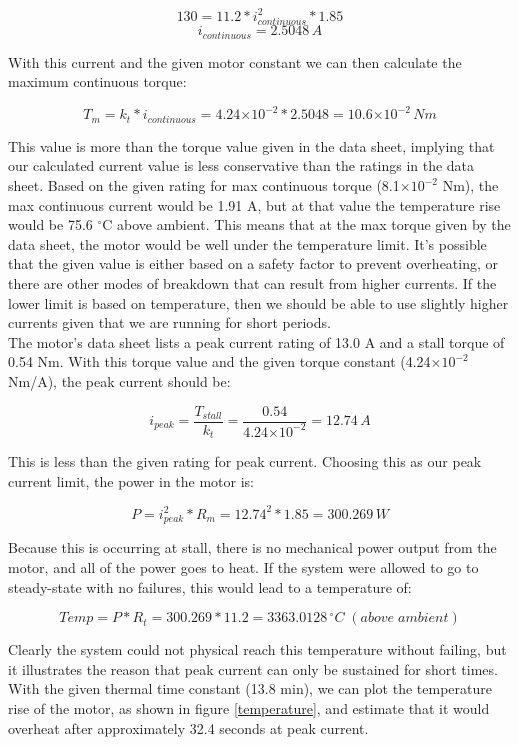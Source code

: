 \documentclass{article}
\theoremstyle{plain}
\theoremstyle{definition}
\theoremstyle{remark}
\providecommand{\e}[1]{\ensuremath{\times 10^{#1}}}
\begin{document}
$$130 = 11.2*i_{continuous}^2*1.85$$
$$i_{continuous} = 2.5048 \,A$$

With this current and the given motor constant we can then calculate the maximum continuous torque:

$$T_{m} = k_{t}*i_{continuous} = 4.24\e{-2}*2.5048 = 10.6\e{-2}\, Nm$$

This value is more than the torque value given in the data sheet, implying that our calculated current value is less conservative than the ratings in the data sheet. Based on the given rating for max continuous torque (8.1$\e{-2}$ Nm), the max continuous current would be 1.91 A, but at that value the temperature rise would be 75.6 $^\circ$C above ambient. This means that at the max torque given by the data sheet, the motor would be well under the temperature limit. It's possible that the given value is either based on a safety factor to prevent overheating, or there are other modes of breakdown that can result from higher currents. If the lower limit is based on temperature, then we should be able to use slightly higher currents given that we are running for short periods.\\

The motor's data sheet lists a peak current rating of 13.0 A and a stall torque of 0.54 Nm. With this torque value and the given torque constant (4.24$\e{-2}$ Nm/A), the peak current should be:


$$i_{peak} = \frac{T_{stall}}{k_{t}} = \frac{0.54}{4.24\e{-2}} = 12.74 \,A$$

This is less than the given rating for peak current. Choosing this as our peak current limit, the power in the motor is:


$$P = i_{peak}^2 * R_{m} = 12.74^2 * 1.85 = 300.269 \,W$$

Because this is occurring at stall, there is no mechanical power output from the motor, and all of the power goes to heat. If the system were allowed to go to steady-state with no failures, this would lead to a temperature of:

$$Temp = P * R_{t} = 300.269 * 11.2 = 3363.0128  \,{^\circ}C\;(above \;ambient)$$ 

Clearly the system could not physical reach this temperature without failing, but it illustrates the reason that peak current can only be sustained for short times. With the given thermal time constant (13.8 min), we can plot the temperature rise of the motor, as shown in figure \ref{temperature}, and estimate that it would overheat after approximately 32.4 seconds at peak current. 
\end{document}
